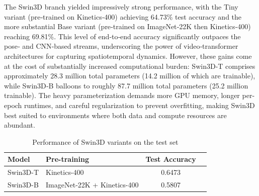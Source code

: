 \documentclass[journal,onecolumn, 11pt]{IEEEtran}
\begin{document}
The Swin3D branch yielded impressively strong performance, with the Tiny variant (pre‐trained on Kinetics‐400) achieving 64.73\% test accuracy and the more substantial Base variant (pre‐trained on ImageNet‐22K then Kinetics‐400) reaching 69.81\%. This level of end‐to‐end accuracy significantly outpaces the pose‐ and CNN‐based streams, underscoring the power of video‐transformer architectures for capturing spatiotemporal dynamics. However, these gains come at the cost of substantially increased computational burden: Swin3D‐T comprises approximately 28.3 million total parameters (14.2 million of which are trainable), while Swin3D‐B balloons to roughly 87.7 million total parameters (25.2 million trainable). The heavy parameterization demands more GPU memory, longer per‐epoch runtimes, and careful regularization to prevent overfitting, making Swin3D best suited to environments where both data and compute resources are abundant.

\begin{table}[H]
\centering
\caption{Performance of Swin3D variants on the test set}
\label{tab:swin3d-results}
\begin{tabular}{l l c c}
\hline
\textbf{Model} & \textbf{Pre-training}  & \textbf{Test Accuracy} \\
\hline
Swin3D-T & Kinetics-400 & 0.6473 \\
Swin3D-B & ImageNet-22K + Kinetics-400 & 0.5807 \\
\hline
\end{tabular}
\end{table}



\end{document}
